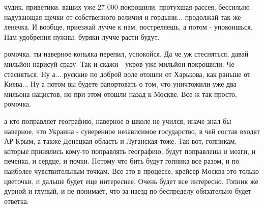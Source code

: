 чудик. приветики. ваших уже 27 000 покрошили. протухшая рассея, бессильно
надувающая щечки от собственного величия и гордыни... продолжай так же ленечка.
И вообще, приезжай лучче к нам, постреляешь, а потом - упокоишься. Нам
удобрения нужны. буряки лучче расти будут.

ромочка. ты наверное коньяка перепил, успокойся. Да че уж стесняться, давай
мильйон нарисуй сразу. Так и скажи - укров уже мильйон покрошили. Че
стесняться. Ну а... русккие по доброй воле отошли от Харькова, как раньше от
Киева... Ну а потом вы будете рапортовать о том, что уничтожили уже два мильона
нацистов, но при этом отошли назад к Москве. Все ж так просто, ромочка.

а кто поправляет географию, наверное в школе не учился, иначе знал бы наверное,
что Украина - суверенное независимое государство, в чей состав входят АР Крым,
а также Донецкая область и Луганская тоже. Так вот, гопникам, которые принялись
кому-то поправлять географию, будут поправлены и мозги, и печенка, и сердце, и
почки. Потому что бить будут гопника все разом, и по наиболее чувствительным
точкам. Все это в процессе, крейсер Москва это только цветочки, и дальше будет
еще интереснее. Очень будет все интересно. Гопник же дурной и глупый, и не
понимает, что за наезд по беспределу обязательно будет ответка.
